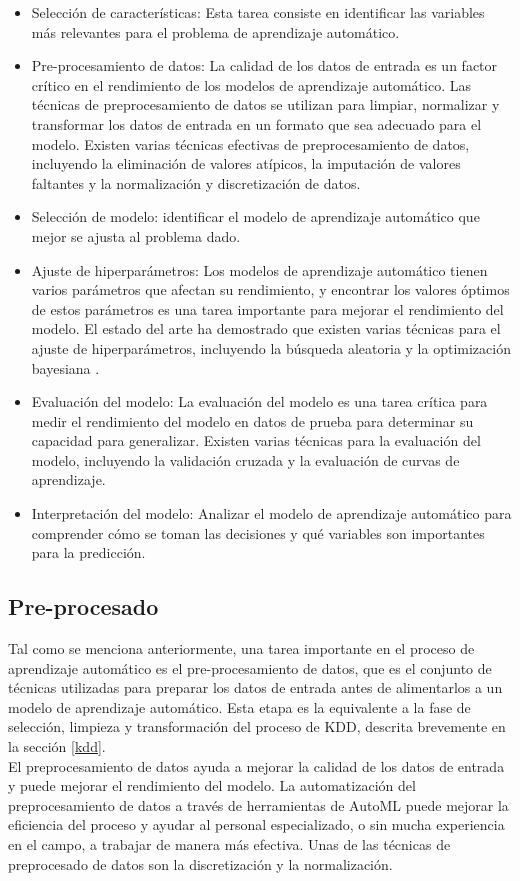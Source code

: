 \begin{itemize}
	\item Selección de características: Esta tarea consiste en identificar las variables más relevantes para el problema de aprendizaje automático. 
	\item Pre-procesamiento de datos: La calidad de los datos de entrada es un factor crítico en el rendimiento de los modelos de aprendizaje automático. Las técnicas de preprocesamiento de datos se utilizan para limpiar, normalizar y transformar los datos de entrada en un formato que sea adecuado para el modelo. Existen varias técnicas efectivas de preprocesamiento de datos, incluyendo la eliminación de valores atípicos, la imputación de valores faltantes y la normalización y discretización de datos.
	\item Selección de modelo: identificar el modelo de aprendizaje automático que mejor se ajusta al problema dado.
	\item Ajuste de hiperparámetros: Los modelos de aprendizaje automático tienen varios parámetros que afectan su rendimiento, y encontrar los valores óptimos de estos parámetros es una tarea importante para mejorar el rendimiento del modelo. El estado del arte ha demostrado que existen varias técnicas para el ajuste de hiperparámetros, incluyendo la búsqueda aleatoria \citep{zoller2021benchmark} y la optimización bayesiana \citep{he2021automl} \cite{hutter2019automated}.
	\item Evaluación del modelo: La evaluación del modelo es una tarea crítica para medir el rendimiento del modelo en datos de prueba para determinar su capacidad para generalizar. Existen varias técnicas para la evaluación del modelo, incluyendo la validación cruzada y la evaluación de curvas de aprendizaje.
	\item Interpretación del modelo: Analizar el modelo de aprendizaje automático para comprender cómo se toman las decisiones y qué variables son importantes para la predicción.
\end{itemize}

\subsection{Pre-procesado}
Tal como se menciona anteriormente, una tarea importante en el proceso de aprendizaje automático es el pre-procesamiento de datos, que es el conjunto de técnicas utilizadas para preparar los datos de entrada antes de alimentarlos a un modelo de aprendizaje automático. Esta etapa es la equivalente a la fase de selección, limpieza y transformación del proceso de KDD, descrita brevemente en la sección \ref{kdd}. \\
El preprocesamiento de datos ayuda a mejorar la calidad de los datos de entrada y puede mejorar el rendimiento del modelo. La automatización del preprocesamiento de datos a través de herramientas de AutoML puede mejorar la eficiencia del proceso y ayudar al personal especializado, o sin mucha experiencia en el campo, a trabajar de manera más efectiva. Unas de las técnicas de preprocesado de datos son la discretización y la normalización.

